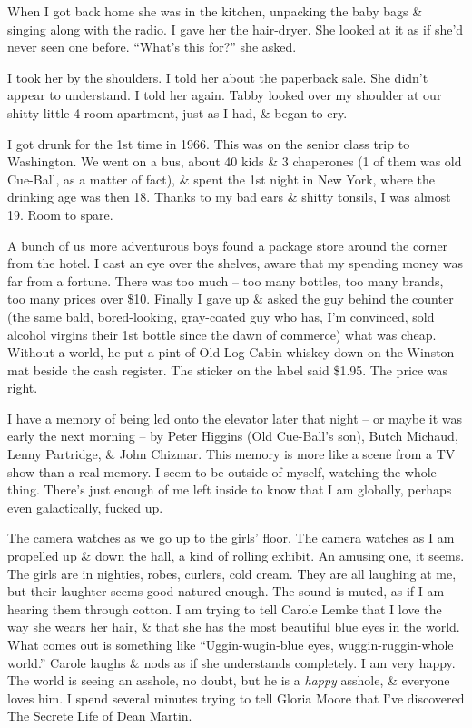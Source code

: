 \documentclass{article}
\numberwithin{equation}{section}
\begin{document}
When I got back home she was in the kitchen, unpacking the baby bags \& singing along with the radio. I gave her the hair-dryer. She looked at it as if she'd never seen one before. ``What's this for?'' she asked.

I took her by the shoulders. I told her about the paperback sale. She didn't appear to understand. I told her again. Tabby looked over my shoulder at our shitty little 4-room apartment, just as I had, \& began to cry.

 I got drunk for the 1st time in 1966. This was on the senior class trip to Washington. We went on a bus, about 40 kids \& 3 chaperones (1 of them was old Cue-Ball, as a matter of fact), \& spent the 1st night in New York, where the drinking age was then 18. Thanks to my bad ears \& shitty tonsils, I was almost 19. Room to spare.

A bunch of us more adventurous boys found a package store around the corner from the hotel. I cast an eye over the shelves, aware that my spending money was far from a fortune. There was too much -- too many bottles, too many brands, too many prices over \$10. Finally I gave up \& asked the guy behind the counter (the same bald, bored-looking, gray-coated guy who has, I'm convinced, sold alcohol virgins their 1st bottle since the dawn of commerce) what was cheap. Without a world, he put a pint of Old Log Cabin whiskey down on the Winston mat beside the cash register. The sticker on the label said \$1.95. The price was right.

I have a memory of being led onto the elevator later that night -- or maybe it was early the next morning -- by Peter Higgins (Old Cue-Ball's son), Butch Michaud, Lenny Partridge, \& John Chizmar. This memory is more like a scene from a TV show than a real memory. I seem to be outside of myself, watching the whole thing. There's just enough of me left inside to know that I am globally, perhaps even galactically, fucked up.

The camera watches as we go up to the girls' floor. The camera watches as I am propelled up \& down the hall, a kind of rolling exhibit. An amusing one, it seems. The girls are in nighties, robes, curlers, cold cream. They are all laughing at me, but their laughter seems good-natured enough. The sound is muted, as if I am hearing them through cotton. I am trying to tell Carole Lemke that I love the way she wears her hair, \& that she has the most beautiful blue eyes in the world. What comes out is something like ``Uggin-wugin-blue eyes, wuggin-ruggin-whole world.'' Carole laughs \& nods as if she understands completely. I am very happy. The world is seeing an asshole, no doubt, but he is a \textit{happy} asshole, \& everyone loves him. I spend several minutes trying to tell Gloria Moore that I've discovered The Secrete Life of Dean Martin.
\end{document}
